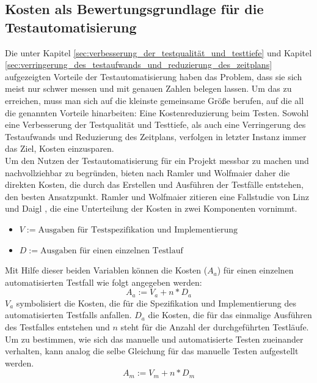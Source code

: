 \subsection{Kosten als Bewertungsgrundlage für die Testautomatisierung}
\label{sec:kosten_der_testautomatisierung}
Die unter Kapitel \ref{sec:verbesserung_der_testqualität_und_testtiefe} und Kapitel \ref{sec:verringerung_des_testaufwands_und_reduzierung_des_zeitplans} aufgezeigten Vorteile der Testautomatisierung haben das Problem, dass sie sich meist nur schwer messen und mit genauen Zahlen belegen lassen.
Um das zu erreichen, muss man sich auf die kleinste gemeinsame Größe berufen, auf die all die genannten Vorteile hinarbeiten: Eine Kostenreduzierung beim Testen.
Sowohl eine Verbesserung der Testqualität und Testtiefe, als auch eine Verringerung des Testaufwands und Reduzierung des Zeitplans, verfolgen in letzter Instanz immer das Ziel, Kosten einzusparen.\\
Um den Nutzen der Testautomatisierung für ein Projekt messbar zu machen und nachvollziehbar zu begründen, bieten nach Ramler und Wolfmaier \cite{ramler_economic_2006} daher die direkten Kosten, die durch das Erstellen und Ausführen der Testfälle entstehen, den besten Ansatzpunkt. 
Ramler und Wolfmaier \cite{ramler_economic_2006} zitieren eine Fallstudie von Linz und Daigl \cite{dustin_automated_1999}, die eine Unterteilung der Kosten in zwei Komponenten vornimmt.
\begin{itemize}
    \item[] \(V:=\text{Ausgaben für Testspezifikation und Implementierung}\)
    \item[] \(D:=\text{Ausgaben für einen einzelnen Testlauf}\)
\end{itemize}

Mit Hilfe dieser beiden Variablen können die Kosten (\(A_a\)) für einen einzelnen automatisierten Testfall wie folgt angegeben werden:
\begin{equation}
A_a:=V_a+n*D_a
\end{equation}
\(V_a\) symbolisiert die Kosten, die für die Spezifikation und Implementierung des automatisierten Testfalls anfallen. \(D_a\) die Kosten, die für das einmalige Ausführen des Testfalles entstehen und \(n\) steht für die Anzahl der durchgeführten Testläufe.
Um zu bestimmen, wie sich das manuelle und automatisierte Testen zueinander verhalten, kann analog die selbe Gleichung für das manuelle Testen aufgestellt werden.
\begin{equation}
A_m:=V_m+n*D_m
\end{equation}

